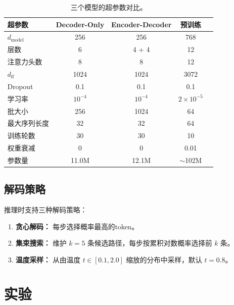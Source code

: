\documentclass[11pt,a4paper]{article}
\begin{document}
\begin{table}[H]
\centering
\small
\renewcommand{\arraystretch}{1.1}
\caption{三个模型的超参数对比。}
\label{tab:hyperparams}
\begin{tabular}{lcccc}
\toprule
\textbf{超参数} & \textbf{Decoder-Only} & \textbf{Encoder-Decoder} & \textbf{预训练} \\
\midrule
\(d_{\text{model}}\)    & 256   & 256   & 768 \\
层数                    & 6     & 4 + 4 & 12 \\
注意力头数              & 8     & 8     & 12 \\
\(d_{\text{ff}}\)       & 1024  & 1024  & 3072 \\
Dropout                 & 0.1   & 0.1   & 0.1 \\
学习率                  & \(10^{-4}\) & \(10^{-4}\) & \(2\times10^{-5}\) \\
批大小                  & 256   & 1024  & 64 \\
最大序列长度            & 32    & 32    & 64 \\
训练轮数                & 30    & 30    & 10 \\
权重衰减                & 0     & 0     & 0.01 \\
参数量                  & 11.0M & 12.1M & \(\sim\)102M \\
\bottomrule
\end{tabular}
\end{table}

\subsection{解码策略}

推理时支持三种解码策略：
\begin{enumerate}[nosep]
    \item \textbf{贪心解码：}
          每步选择概率最高的token。
    \item \textbf{集束搜索：}
          维护 \(k=5\) 条候选路径，每步按累积对数概率选择前 \(k\) 条。
    \item \textbf{温度采样：}
          从由温度 \(t \in [0.1, 2.0]\) 缩放的分布中采样，默认 \(t=0.8\)。
\end{enumerate}

\section{实验}
\label{sec:experiments}
\end{document}
